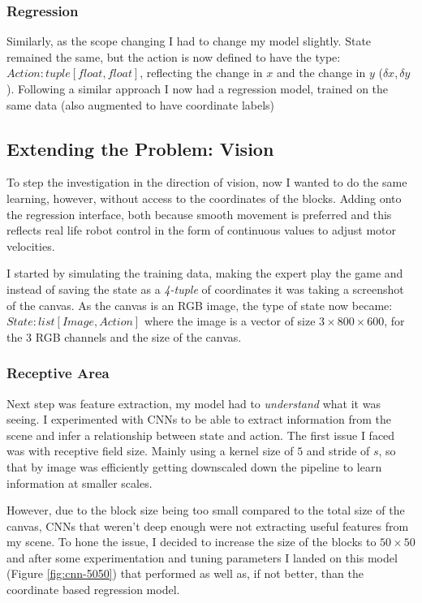 \subsubsection{Regression}
Similarly, as the scope changing I had to change my model slightly. State remained the same, but the action is now defined to have the type: \(Action: tuple[float, float]\), reflecting the change in $x$ and the change in $y$ (\(\delta x , \delta y\)).
Following a similar approach I now had a regression model, trained on the same data (also augmented to have coordinate labels)


\subsection{Extending the Problem: Vision}
To step the investigation in the direction of vision, now I wanted to do the same learning, however, without access to the coordinates of the blocks. Adding onto the regression interface, both because smooth movement is preferred and this reflects real life robot control in the form of continuous values to adjust motor velocities.

I started by simulating the training data, making the expert play the game and instead of saving the state as a \emph{4-tuple} of coordinates it was taking a screenshot of the canvas. As the canvas is an RGB image, the type of state now became: $State: list[Image, Action]$ where the image is a vector of size $3 \times 800 \times 600$, for the 3 RGB channels and the size of the canvas.

\subsubsection{Receptive Area}
Next step was feature extraction, my model had to \emph{understand} what it was seeing. I experimented with CNNs to be able to extract information from the scene and infer a relationship between state and action. The first issue I faced was with receptive field size. Mainly using a kernel size of $5$ and stride of $s$, so that by image was efficiently getting downscaled down the pipeline to learn information at smaller scales. 

However, due to the block size being too small compared to the total size of the canvas, CNNs that weren't deep enough were not extracting useful features from my scene. To hone the issue, I decided to increase the size of the blocks to $50 \times 50$ and after some experimentation and tuning parameters I landed on this model (Figure \ref{fig:cnn-5050}) that performed as well as, if not better, than the coordinate based regression model.



